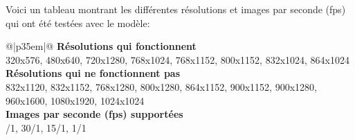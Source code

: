 \par Voici un tableau montrant les différentes résolutions et images par seconde (\acrshort{fps}) qui ont été testées avec le modèle:
{
    \renewcommand*{\arraystretch}{1.4}
    \begin{table}[ht]
    \centering
    \caption{Résolutions et images par seconde (\acrshort{fps}) testés}\label{table:resolutions_tested}
    \vspace{0.1em} %
    \begin{tabular}{{@{}|p{35em}|@{}}}
         \hline
         \textbf{Résolutions qui fonctionnent}\\
         \hline
        320x576, 480x640, 720x1280, 768x1024, 768x1152, 800x1152, 832x1024, 864x1024\\
        \hline
        \textbf{Résolutions qui ne fonctionnent pas}\\
        \hline
        832x1120, 832x1152, 768x1280, 800x1280, 864x1152, 900x1152, 900x1280, 960x1600, 1080x1920, 1024x1024\\
        \hline
        \textbf{Images par seconde (\acrshort{fps}) supportées}\\
        /1, 30/1, 15/1, 1/1\\
        \hline
    \end{tabular}
    \end{table}
}
